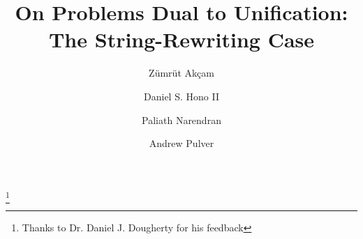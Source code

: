 \documentclass{lmcs} %
\theoremstyle{plain}\newtheorem{satz}[thm]{Satz} %
\begin{document}
\title[On Problems Dual to Unification: The String-Rewriting Case]{On Problems Dual to Unification:\\
\large The String-Rewriting Case}

\author[Akcam]{Z\"{u}mr\"{u}t Ak{\c c}am}	%
\address{The College of Saint Rose, Albany, NY, US}	%
\thanks{Thanks to Dr. Daniel J. Dougherty for his feedback}	%

\author[Hono]{Daniel S. Hono II}	%
\address{University at Albany, SUNY\\ Albany, NY, US}	%

\author[Narendran]{Paliath Narendran}	%
\address{University at Albany, SUNY\\ Albany, NY, US}	%

\author[Pulver]{Andrew Pulver}	%
\address{University at Albany, SUNY\\ Albany, NY, US}	%




\end{document}
